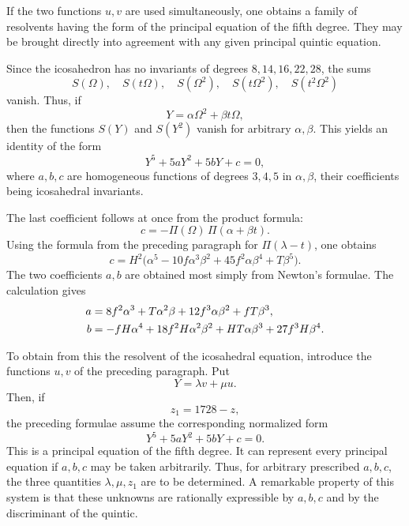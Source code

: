 \documentclass[12pt,a4paper]{article}
\newcommand{\omegaT}{\Omega}
\begin{document}
If the two functions $u,v$ are used simultaneously, one obtains a family of resolvents having the form of the principal equation of the fifth degree.  They may be brought directly into agreement with any given principal quintic equation.

Since the icosahedron has no invariants of degrees $8,14,16,22,28$, the sums
\[
 S(\omegaT),\quad S(t\omegaT),\quad S(\omegaT^2),\quad S(t\omegaT^2),\quad S(t^2\omegaT^2)
\]
vanish.  Thus, if
\begin{equation}
 Y=\alpha\omegaT^2+\beta t\omegaT,
\end{equation}
then the functions $S(Y)$ and $S(Y^2)$ vanish for arbitrary $\alpha,\beta$.  This yields an identity of the form
\begin{equation}
 Y^5+5aY^2+5bY+c=0,
\end{equation}
where $a,b,c$ are homogeneous functions of degrees $3,4,5$ in $\alpha,
\beta$, their coefficients being icosahedral invariants.

The last coefficient follows at once from the product formula:
\begin{equation}
 c=-\Pi(\omegaT)\,\Pi(\alpha+\beta t).
\end{equation}
Using the formula from the preceding paragraph for $\Pi(\lambda-t)$, one obtains
\begin{equation}
 c=H^2\bigl(\alpha^5-10f\alpha^3\beta^2+45f^2\alpha\beta^4+T\beta^5\bigr).
\end{equation}
The two coefficients $a,b$ are obtained most simply from Newton's formulae.  The calculation gives
\begin{align}
 a&=8f^2\alpha^3+T\alpha^2\beta+12f^3\alpha\beta^2+fT\beta^3,\notag\\
 b&=-fH\alpha^4+18f^2H\alpha^2\beta^2+HT\alpha\beta^3+27f^3H\beta^4.
\end{align}

To obtain from this the resolvent of the icosahedral equation, introduce the functions $u,v$ of the preceding paragraph.  Put
\begin{equation}
 Y=\lambda v+\mu u.
\end{equation}
Then, if
\begin{equation}
 z_1=1728-z,
\end{equation}
the preceding formulae assume the corresponding normalized form
\begin{equation}
 Y^5+5aY^2+5bY+c=0.
\end{equation}
This is a principal equation of the fifth degree.  It can represent every principal equation if $a,b,c$ may be taken arbitrarily.  Thus, for arbitrary prescribed $a,b,c$, the three quantities $\lambda,\mu,z_1$ are to be determined.  A remarkable property of this system is that these unknowns are rationally expressible by $a,b,c$ and by the discriminant of the quintic.
\end{document}
